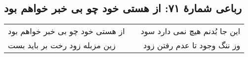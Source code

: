 \begin{center}
\section*{رباعی شمارهٔ ۷۱: از هستی خود چو بی خبر خواهم بود }
\label{sec:071}
\begin{longtable}{l p{0.5cm} r}
از هستی خود چو بی خبر خواهم بود 
&&
این جا بُدنم هیچ نمی دارد سود
\\
زین مزبله زود رخت بر باید بست
&&
وز ننگ وجود تا عدم رفتن زود
\\
\end{longtable}
\end{center}
